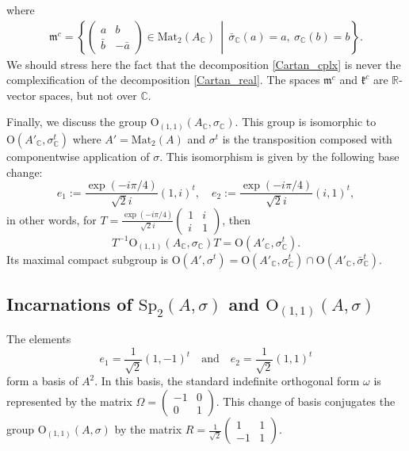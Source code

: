 \documentclass[oneside,11pt]{amsart}
\theoremstyle{definition}
\theoremstyle{remark}
\newcommand{\midwd}{\,\middle\vert\,}
\numberwithin{thm}{section}
\numberwithin{equation}{section}
\begin{document}
where
\begin{align}\label{eq1.10}
    \mathfrak{m}^c=\left\{\begin{pmatrix}
    a&b\\
    \bar b&-\bar a
    \end{pmatrix}\in\mathrm{Mat}_2(A_\mathbb{C})\midwd \bar\sigma_\mathbb{C}(a)=a,\ \sigma_\mathbb{C}(b)=b\right\}.
\end{align}
We should stress here the fact that the decomposition \eqref{Cartan_cplx} is never the complexification of the decomposition \eqref{Cartan_real}. The spaces $\mathfrak m^c$ and $\mathfrak k^c$ are $\mathbb R$-vector spaces, but not over $\mathbb C$. 

Finally, we discuss the group $\mathrm{O}_{(1,1)}(A_\mathbb C,\sigma_{\mathbb C})$. This group is isomorphic to $\mathrm{O}(A'_\mathbb C,\sigma^t_{\mathbb C})$ where $A'=\mathrm{Mat}_2(A)$ and $\sigma^t$ is the transposition composed with componentwise application of $\sigma$. This isomorphism is given by the following base change: 
\[e_1:=\frac{\exp(-i\pi/4)}{\sqrt{2}i}(1,i)^t, \quad  e_2:=\frac{\exp(-i\pi/4)}{\sqrt{2}i}(i,1)^t,\] 
in other words, for 
 $T=\frac{\exp(-i\pi/4)}{\sqrt{2}i}\begin{pmatrix}
    1 & i \\
    i & 1
\end{pmatrix}$, then
$$T^{-1}\mathrm{O}_{(1,1)}(A_\mathbb C,\sigma_{\mathbb C})T=\mathrm{O}(A'_\mathbb C,\sigma^t_{\mathbb C}).$$
Its maximal compact subgroup is $\mathrm{O}(A',\sigma^t)=\mathrm{O}(A'_\mathbb C,\sigma^t_{\mathbb C})\cap \mathrm{O}(A'_\mathbb C,\bar\sigma^t_{\mathbb C})$.


\subsection{Incarnations of \texorpdfstring{$\mathrm{Sp}_{2}(A,\sigma)$ and $\mathrm{O}_{(1,1)}(A,\sigma)$}{}}\label{sec:incarnations}

The elements 
$$e_1=\frac{1}{\sqrt{2}}(1,-1)^t \quad \text{and} \quad  e_2=\frac{1}{\sqrt{2}}(1,1)^t$$
form a basis of $A^2$. In this basis, the standard indefinite orthogonal form $\omega$ is represented by the matrix $\Omega=\begin{pmatrix}
    -1 & 0 \\
    0 & 1
\end{pmatrix}$. This change of basis conjugates the group $\mathrm{O}_{(1,1)}(A,\sigma)$ by the matrix $R=\frac{1}{\sqrt{2}}\begin{pmatrix}
    1 & 1 \\
    -1 & 1
\end{pmatrix}$.
\end{document}
